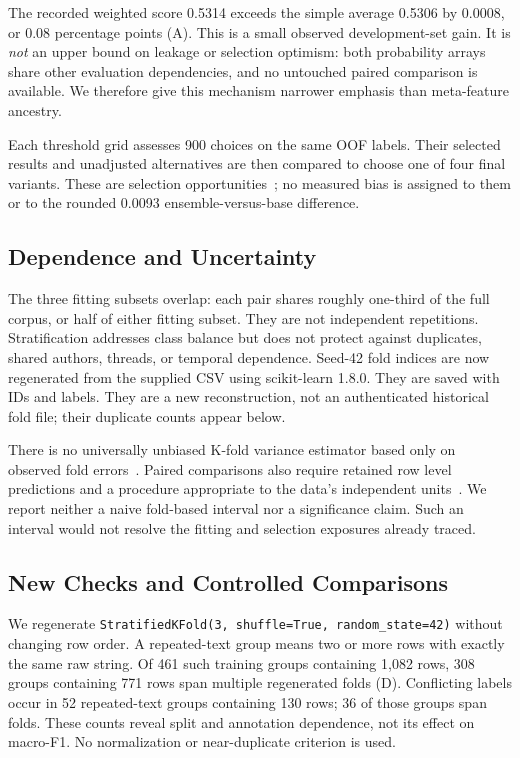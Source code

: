 \documentclass[doublecolumn]{ijcvsplatex}
\begin{document}
The recorded weighted score 0.5314 exceeds the simple average 0.5306 by 0.0008, or 0.08 percentage points (A). This is a small observed development-set gain. It is \emph{not} an upper bound on leakage or selection optimism: both probability arrays share other evaluation dependencies, and no untouched paired comparison is available. We therefore give this mechanism narrower emphasis than meta-feature ancestry.

Each threshold grid assesses 900 choices on the same OOF labels. Their selected results and unadjusted alternatives are then compared to choose one of four final variants. These are selection opportunities~\cite{varma2006bias,cawley2010overfitting}; no measured bias is assigned to them or to the rounded 0.0093 ensemble-versus-base difference.

\subsection{Dependence and Uncertainty}
The three fitting subsets overlap: each pair shares roughly one-third of the full corpus, or half of either fitting subset. They are not independent repetitions. Stratification addresses class balance but does not protect against duplicates, shared authors, threads, or temporal dependence. Seed-42 fold indices are now regenerated from the supplied CSV using scikit-learn 1.8.0. They are saved with IDs and labels. They are a new reconstruction, not an authenticated historical fold file; their duplicate counts appear below.

There is no universally unbiased K-fold variance estimator based only on observed fold errors~\cite{bengio2004variance}. Paired comparisons also require retained row level predictions and a procedure appropriate to the data's independent units~\cite{dror2018significance}. We report neither a naive fold-based interval nor a significance claim. Such an interval would not resolve the fitting and selection exposures already traced.

\subsection{New Checks and Controlled Comparisons}
\label{sec:newchecks}
We regenerate \texttt{StratifiedKFold(3, shuffle=True, random\_state=42)} without changing row order. A repeated-text group means two or more rows with exactly the same raw string. Of 461 such training groups containing 1,082 rows, 308 groups containing 771 rows span multiple regenerated folds (D). Conflicting labels occur in 52 repeated-text groups containing 130 rows; 36 of those groups span folds. These counts reveal split and annotation dependence, not its effect on macro-F1. No normalization or near-duplicate criterion is used.
\end{document}
